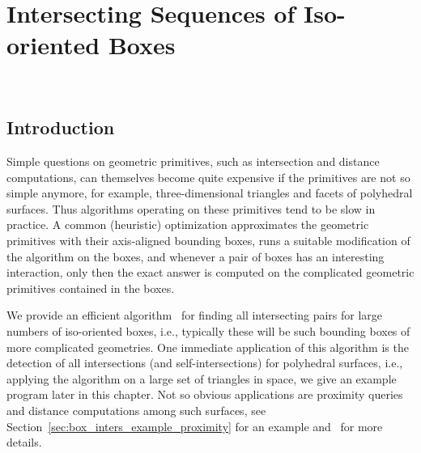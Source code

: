 
\ccParDims

\chapter{Intersecting Sequences of Iso-oriented Boxes}
\label{chapterBoxIntersection}
\\


\section{Introduction}

Simple questions on geometric primitives, such as intersection and
distance computations, can themselves become quite expensive if the
primitives are not so simple anymore, for example, three-dimensional
triangles and facets of polyhedral surfaces. Thus algorithms operating
on these primitives tend to be slow in practice. A common (heuristic)
optimization approximates the geometric primitives with their
axis-aligned bounding boxes, runs a suitable modification of the
algorithm on the boxes, and whenever a pair of boxes has an
interesting interaction, only then the exact answer is computed on the
complicated geometric primitives contained in the boxes.

We provide an efficient algorithm~\cite{cgal:ze-fsbi-02} for finding all
intersecting pairs for large numbers of iso-oriented boxes, i.e.,
typically these will be such bounding boxes of more complicated geometries.
One immediate application of this algorithm is the detection of all
intersections (and self-intersections) for polyhedral surfaces, i.e.,
applying the algorithm on a large set of triangles in space, we give
an example program later in this chapter. Not so obvious applications
are proximity queries and distance computations among such surfaces,
see Section~\ref{sec:box_inters_example_proximity} for an example
and~\cite{cgal:ze-fsbi-02} for more details.  

